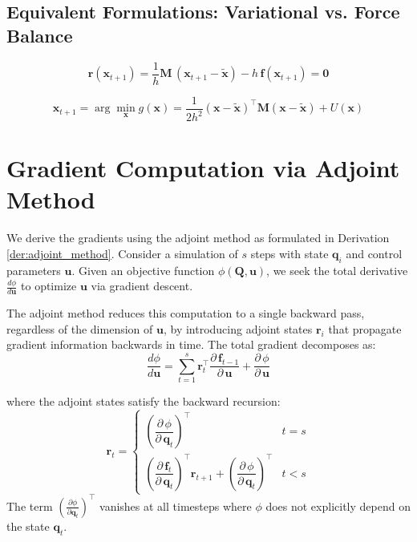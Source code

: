 \documentclass{article}
\newcommand{\pd}[2]{\dfrac{\partial\, #1}{\partial\, #2}}
\newcommand{\pdc}[2]{\frac{\partial #1}{\partial #2}}
\begin{document}
\subsection{Equivalent Formulations: Variational vs. Force Balance}

\begin{equation}
\label{eq:bdf1_residual_position_predictor}
\mathbf{r}(\mathbf{x}_{t+1}) = \frac{1}{h}\mathbf{M}\,(\mathbf{x}_{t+1} - \tilde{\mathbf{x}}) - h\,\mathbf{f}\left(\mathbf{x}_{t+1}\right) = \mathbf{0}
\end{equation}

\begin{equation}
\label{eq:implicit_euler_energy}
\mathbf{x}_{t+1} = \arg \min_{\mathbf{x}} g(\mathbf{x}) = \frac{1}{2h^2}(\mathbf{x} - \tilde{\mathbf{x}})^\top\mathbf{M}(\mathbf{x} - \tilde{\mathbf{x}}) + U(\mathbf{x})
\end{equation}

\newpage

\section{Gradient Computation via Adjoint Method}
\label{sec:adjoint}

We derive the gradients using the adjoint method as formulated in Derivation \ref{der:adjoint_method}. Consider a simulation of $s$ steps with state $\mathbf{q}_i$ and control parameters $\mathbf{u}$. Given an objective function $\phi(\mathbf{Q}, \mathbf{u})$, we seek the total derivative $\frac{d\phi}{d\mathbf{u}}$ to optimize $\mathbf{u}$ via gradient descent.

The adjoint method reduces this computation to a single backward pass, regardless of the dimension of $\mathbf{u}$, by introducing adjoint states $\mathbf{r}_i$ that propagate gradient information backwards in time. The total gradient decomposes as:
\begin{equation}
    \frac{d\phi}{d\mathbf{u}} = \sum_{t=1}^{s} \mathbf{r}_{t}^\top \pd{\mathbf{f}_{t-1}}{\mathbf{u}} + \pd{\phi}{\mathbf{u}}
\end{equation}

where the adjoint states satisfy the backward recursion:
\begin{equation}
\label{eq:adjoint_state_recursion}
    \mathbf{r}_t = \begin{cases} 
        \left(\pd{\phi}{\mathbf{q}_t}\right)^\top & t = s \\[1.5ex]
        \left(\pd{\mathbf{f}_t}{\mathbf{q}_t}\right)^\top \mathbf{r}_{t+1} + \left(\pd{\phi}{\mathbf{q}_t}\right)^\top & t < s
    \end{cases}
\end{equation}
The term $\left(\pdc{\phi}{\mathbf{q}_t}\right)^\top$ vanishes at all timesteps where $\phi$ does not explicitly depend on the state $\mathbf{q}_t$. 
\end{document}
